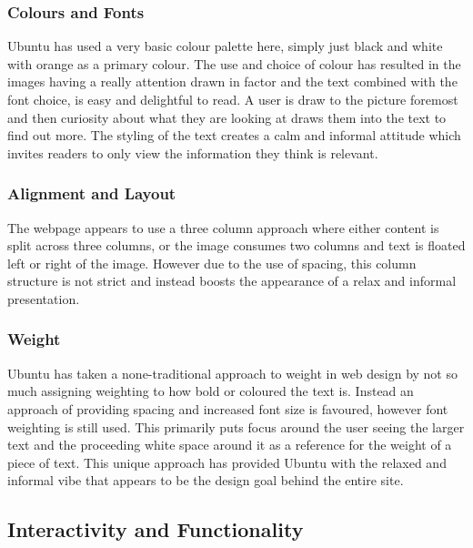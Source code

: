 \subsubsection{Colours and Fonts}
Ubuntu has used a very basic colour palette here, simply just black and white with orange as a primary colour. The use and choice of colour has resulted in the images having a really attention drawn in factor and the text combined with the font choice, is easy and delightful to read. A user is draw to the picture foremost and then curiosity about what they are looking at draws them into the text to find out more. The styling of the text creates a calm and informal attitude which invites readers to only view the information they think is relevant.

\subsubsection{Alignment and Layout}
The webpage appears to use a three column approach where either content is split across three columns, or the image consumes two columns and text is floated left or right of the image. However due to the use of spacing, this column structure is not strict and instead boosts the appearance of a relax and informal presentation.

\subsubsection{Weight}
Ubuntu has taken a none-traditional approach to weight in web design by not so much assigning weighting to how bold or coloured the text is. Instead an approach of providing spacing and increased font size is favoured, however font weighting is still used. This primarily puts focus around the user seeing the larger text and the proceeding white space around it as a reference for the weight of a piece of text. This unique approach has provided Ubuntu with the relaxed and informal vibe that appears to be the design goal behind the entire site.


\subsection{Interactivity and Functionality}


